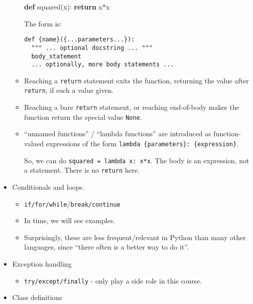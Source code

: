 \documentclass[11pt]{article}
\providecommand{\tightlist}{%
      \setlength{\itemsep}{0pt}\setlength{\parskip}{0pt}}
\newenvironment{Shaded}{}{}
\newcommand{\KeywordTok}[1]{\textcolor[rgb]{0.00,0.44,0.13}{\textbf{{#1}}}}
\newcommand{\NormalTok}[1]{{#1}}
\newcommand{\ControlFlowTok}[1]{\textcolor[rgb]{0.00,0.44,0.13}{\textbf{{#1}}}}
\newcommand{\OperatorTok}[1]{\textcolor[rgb]{0.40,0.40,0.40}{{#1}}}
\begin{document}
\begin{itemize}
\begin{itemize}
\begin{Shaded}
\begin{Highlighting}[]
\KeywordTok{def}\NormalTok{ squared(x):}
  \ControlFlowTok{return}\NormalTok{ x}\OperatorTok{*}\NormalTok{x}
\end{Highlighting}
\end{Shaded}

    The form is:

\begin{verbatim}
def {name}({...parameters...}):
  """ ... optional docstring ... """
  body_statement
  ... optionally, more body statements ...
\end{verbatim}
  \item
    Reaching a \texttt{return} statement exits the function, returning
    the value after \texttt{return}, if such a value given.
  \item
    Reaching a bare \texttt{return} statement, or reaching end-of-body
    makes the function return the special value \texttt{None}.
  \item
    ``unnamed functions'' / ``lambda functions'' are introduced as
    function-valued expressions of the form
    \texttt{lambda\ \{parameters\}:\ \{expression\}}.

    So, we can do \texttt{squared\ =\ lambda\ x:\ x*x}. The body is an
    expression, not a statement. There is no \texttt{return} here.
  \end{itemize}
\item
  Conditionals and loops.

  \begin{itemize}
  \tightlist
  \item
    \texttt{if/for/while}/\texttt{break/continue}
  \item
    In time, we will see examples.
  \item
    Surprisingly, these are less frequent/relevant in Python than many
    other languages, since ``there often is a better way to do it''.
  \end{itemize}
\item
  Exception handling

  \begin{itemize}
  \tightlist
  \item
    \texttt{try/except/finally} - only play a side role in this course.
  \end{itemize}
\item
  Class definitions


\end{itemize}
\end{document}
